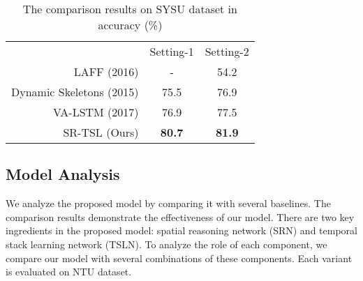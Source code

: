 \documentclass[runningheads]{llncs}
\begin{document}
\setlength{\tabcolsep}{8pt}
\begin{table}[!b]
\fontsize{8pt}{0.85\baselineskip}\selectfont
\begin{center}
\caption{The comparison results on SYSU dataset in accuracy (\%) }
\label{SYSU_comparison}
\begin{tabular}{r|cc}
\hline\noalign{\smallskip}
\multicolumn{1}{c|}{Methods} & Setting-1  & Setting-2  \\
\noalign{\smallskip}
\hline
\hline
\noalign{\smallskip}
LAFF \cite{Hu2016Real} (2016)                    &   -  & 54.2 \\
Dynamic Skeletons \cite{Hu2015Jointly} (2015)    & 75.5 & 76.9 \\
VA-LSTM \cite{Zhang2017View} (2017)              & 76.9 & 77.5 \\
\hline
SR-TSL (Ours)                             & \textbf{80.7} & \textbf{81.9}\\
\hline
\end{tabular}
\end{center}
\end{table}

\subsection{Model Analysis}

We analyze the proposed model by comparing it with several baselines. The comparison results demonstrate the effectiveness of our model. There are two key ingredients in the proposed model:  spatial reasoning network (SRN) and temporal stack learning network (TSLN). To analyze the role of each component, we compare our model with several combinations of these components. Each variant is evaluated on NTU dataset.
\end{document}
